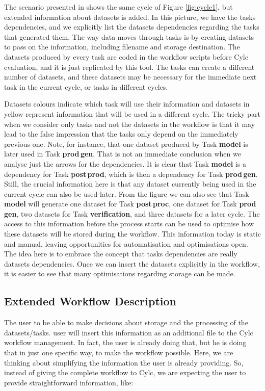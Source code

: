 \documentclass[a4paper]{article}
\begin{document}
The scenario presented in  shows the same cycle of Figure \ref{fig:cycle1}, but  extended information about datasets is added.
In this picture, we have the tasks dependencies, and we explicitly list the datasets dependencies regarding the tasks that generated them.
The way data moves through tasks is by creating datasets to pass on the information, including filename and storage destination.
The datasets produced by every task are coded in the workflow scripts before Cylc evaluation, and it is just replicated by this tool. The tasks can create a different number of datasets, and these datasets may be necessary for the immediate next task in the current cycle, or tasks in different cycles.

Datasets colours indicate which task will use their information and datasets in yellow represent information that will be used in a different cycle. The tricky part when we consider only tasks and not the datasets in the workflow is that it may lead to the false impression that the tasks only depend on the immediately previous one. Note, for instance, that one dataset produced by Task \textbf{model} is later used in Task \textbf{prod\,gen}. That is not an immediate conclusion when we analyse just the arrows for the dependencies. It is clear that Task \textbf{model} is a dependency for Task \textbf{post\,prod}, which is then a dependency for Task \textbf{prod\,gen}. Still, the crucial information here is that any dataset currently being used in the current cycle can also be used later. From the figure we can also see that Task \textbf{model} will generate one dataset for Task \textbf{post\,proc}, one dataset for Task \textbf{prod\,gen}, two datasets for Task \textbf{verification}, and three datasets for a later cycle.
The access to this information before the process starts can be used to optimise how these datasets will be stored during the workflow. This information today is static and manual, leaving opportunities for automatisation and optimisations open.
The idea here is to embrace the concept that tasks dependencies are really datasets dependencies. Once we can insert the datasets explicitly in the workflow, it is easier to see that many optimisations regarding storage can be made.

\subsection{Extended Workflow Description}


The user to be able to make decisions about storage and the processing of the datasets/tasks.
user will insert this information as an additional file to the Cylc workflow management.
In fact, the user is already doing that, but he is doing that in just one specific way, to make the workflow possible. Here, we are thinking about simplifying the information the user is already providing. So, instead of giving the complete workflow to Cylc, we are expecting the user to provide straightforward information, like:
\end{document}
